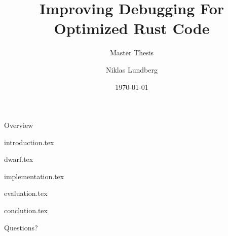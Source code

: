 \documentclass[aspectratio=169,xcolor=dvipsnames]{beamer}
\title[short title]{Improving Debugging For Optimized Rust Code}
\subtitle{Master Thesis}
\author[Niklas] {Niklas Lundberg}
\institute[LTU] %
{
    Department of Computer Science, Electrical and Space Engineering \\
    Luleå University of Technology
    \vskip 3pt
}
\date{\today} %
\begin{document}
\begin{frame}
    \titlepage
\end{frame}

\begin{frame}{Overview}
    \tableofcontents
\end{frame}



{introduction.tex}


{dwarf.tex}


{implementation.tex}


{evaluation.tex}


{conclution.tex}




\begin{frame}
    \Huge{\centerline{Questions?}}
\end{frame}

\end{document}
